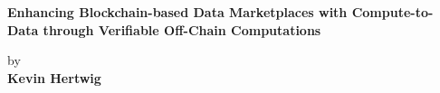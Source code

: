 \begin{titlepage}
\strut
\hfill
\begin{center}
\vspace{1cm}
    \Huge
    \begin{spacing}{0.9}
        \textbf{Enhancing Blockchain-based Data Marketplaces with Compute-to-Data through Verifiable Off-Chain Computations}
    \end{spacing}
    \vspace{0.8cm}
    \large
    by\\
    \vspace{0.8cm}
    \textbf{Kevin Hertwig}\\
    \vspace{0.8cm}

\end{center}
\end{titlepage}
